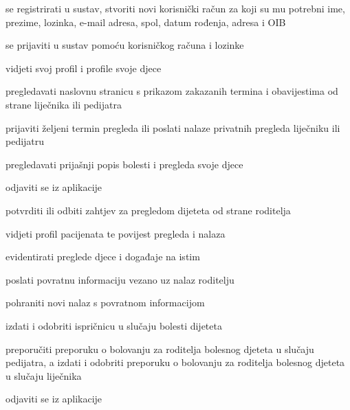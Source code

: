 			
			\begin{packed_enum}
				\item  {}
				
				\begin{packed_enum}
					\item se registrirati u sustav, stvoriti novi korisnički račun za koji su mu potrebni ime, prezime,  lozinka, e-mail adresa, spol, datum rođenja, adresa i OIB
				\item se prijaviti u sustav pomoću korisničkog računa i lozinke
				\end{packed_enum}
			
				\item  {}
				\begin{packed_enum}
					\item vidjeti svoj profil i profile svoje djece
					\item pregledavati naslovnu stranicu s prikazom zakazanih termina i obavijestima od strane liječnika ili pedijatra
					\item prijaviti željeni termin pregleda ili poslati nalaze privatnih pregleda liječniku ili pedijatru
					\item pregledavati prijašnji popis bolesti i pregleda svoje djece
					\item odjaviti se iz aplikacije
				\end{packed_enum}
			
				\item  {}
				\begin{packed_enum}
					\item potvrditi ili odbiti zahtjev za pregledom dijeteta od strane roditelja
					\item vidjeti profil pacijenata te povijest pregleda i nalaza
					\item evidentirati preglede djece i događaje na istim
					\item poslati povratnu informaciju vezano uz nalaz roditelju
					\item pohraniti novi nalaz s povratnom informacijom
					\item izdati i odobriti ispričnicu u slučaju bolesti dijeteta
					\item preporučiti preporuku o bolovanju za roditelja bolesnog djeteta u slučaju pedijatra, a izdati i odobriti preporuku o bolovanju za roditelja bolesnog djeteta u slučaju liječnika
					\item odjaviti se iz aplikacije
				\end{packed_enum}
				

\end{packed_enum}

